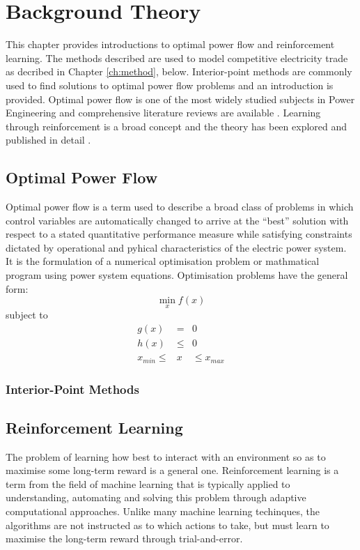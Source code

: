 \chapter{Background Theory}
This chapter provides introductions to optimal power flow and reinforcement
learning.  The methods described are used to model competitive electricity
trade as decribed in Chapter \ref{ch:method}, below.  Interior-point methods
are commonly used to find solutions to optimal power flow problems and an
introduction is provided.  Optimal power flow is one of the most widely studied
subjects in Power Engineering and comprehensive literature reviews are
available \cite{momoh:part1,momoh:part2}.  Learning through reinforcement is a
broad concept and the theory has been explored and published in detail
\cite{suttonbarto:1998,bertsekas:96}.

\section{Optimal Power Flow}
\label{sec:opf}
Optimal power flow is a term used to describe a broad class of problems in
which control variables are automatically changed to arrive at the ``best''
solution with respect to a stated quantitative performance measure while
satisfying constraints dictated by operational and pyhical characteristics of
the electric power system.  It is the formulation of a numerical optimisation
problem or mathmatical program using power system equations.   Optimisation
problems have the general form:
\begin{equation}
\min_x f(x)
\end{equation}
subject to
\begin{eqnarray}
g(x)& =& 0\\
h(x)& \leq& 0\\
x_{min}\leq& x& \leq x_{max}
\end{eqnarray}

\subsection{Interior-Point Methods}

\section{Reinforcement Learning}
\label{sec:rl}
The problem of learning how best to interact with an environment so as to
maximise some long-term reward is a general one.  Reinforcement learning is a
term from the field of machine learning that is typically applied to
understanding, automating and solving this problem through adaptive
computational approaches.  Unlike many machine learning techinques, the
algorithms are not instructed as to which actions to take, but must learn to
maximise the long-term reward through trial-and-error.

